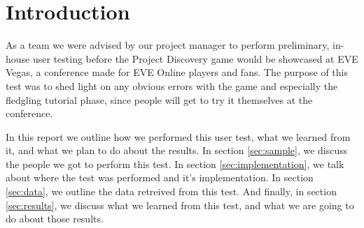 \section{Introduction}\label{sec:introduction}
As a team we were advised by our project manager to perform preliminary, in-house user testing before the Project Discovery game would be showcased at EVE Vegas, a conference made for EVE Online players and fans. The purpose of this test was to shed light on any obvious errors with the game and especially the fledgling tutorial phase, since people will get to try it themselves at the conference. 

In this report we outline how we performed this user test, what we learned from it, and what we plan to do about the results. In section \ref{sec:sample}, we discuss the people we got to perform this test. In section \ref{sec:implementation}, we talk about where the test was performed and it's implementation. In section \ref{sec:data}, we outline the data retreived from this test. And finally, in section \ref{sec:results}, we discuss what we learned from this test, and what we are going to do about those results.